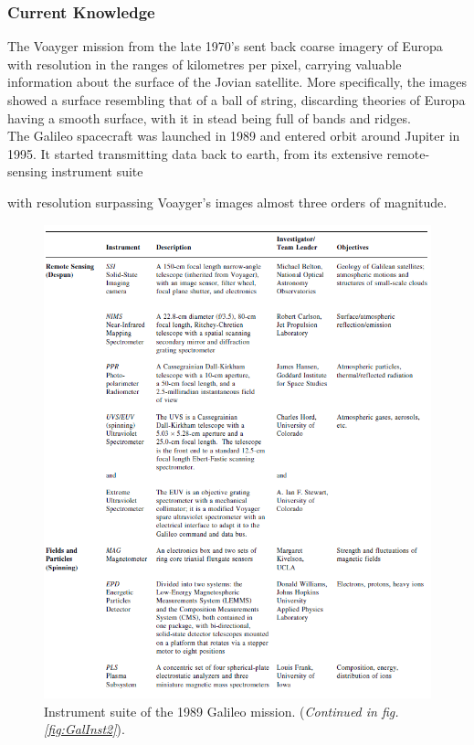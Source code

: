 \subsubsection{Current Knowledge}
The Voayger mission from the late 1970's sent back coarse imagery of Europa with resolution in the ranges of kilometres per pixel, carrying valuable information about the surface of the Jovian satellite\cite{VoyagImg}. More specifically, the images showed a surface resembling that of a ball of string, discarding theories of Europa having a smooth surface, with it in stead being full of bands and ridges.\\%
The Galileo spacecraft was launched in 1989 and entered orbit around Jupiter in 1995. It started transmitting data back to earth, from its extensive remote-sensing instrument suite

 with resolution surpassing Voayger's images almost three orders of magnitude. 
\iffalse
\begin{figure}[htb]
	\centering
	\includegraphics[width=\textwidth]{figures/Rasmus/GalileoInstrument1}
	\caption{Instrument suite of the 1989 Galileo mission.\cite{SciStrat} (\textit{Continued in fig. \ref{fig:GalInst2}}). \label{fig:GalInst1}}
\end{figure}
